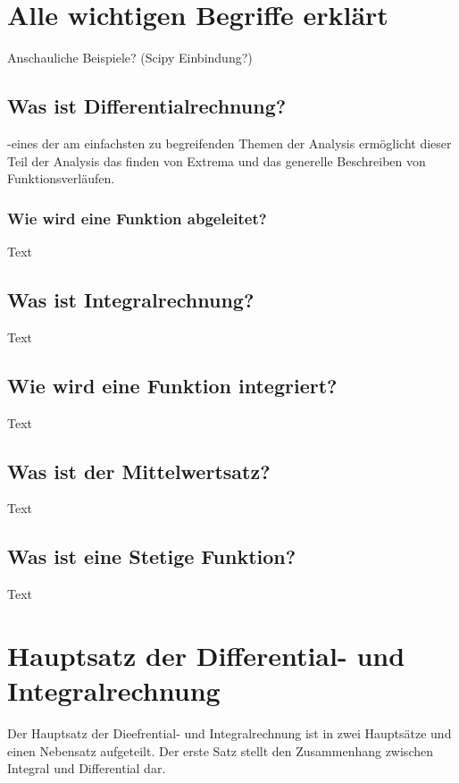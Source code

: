 \documentclass[fontsize=12pt,paper=a4,DIV12,cleardoublepage=empty, 
liststotoc,idxtotoc,bibtotoc]{article}
\theoremstyle{plain}
\theoremstyle{definition}
\begin{document}
	\section{Alle wichtigen Begriffe erklärt}
	Anschauliche Beispiele? (Scipy Einbindung?)
	
	
	\subsection{Was ist Differentialrechnung?}
	-eines der am einfachsten zu begreifenden Themen der Analysis ermöglicht dieser Teil der Analysis das finden von Extrema und das generelle Beschreiben von Funktionsverläufen.
	
	
	\subsubsection{Wie wird eine Funktion abgeleitet?}
		Text
	
	
	\subsection{Was ist Integralrechnung?}
		Text


	\subsection{Wie wird eine Funktion integriert?}
		Text
		
	
	\subsection{Was ist der Mittelwertsatz?}
		Text
		
	
	\subsection{Was ist eine Stetige Funktion?}
		Text	
	
	
	
	
	\section{Hauptsatz der Differential- und Integralrechnung}
	
	Der Hauptsatz der Dieefrential- und Integralrechnung ist in zwei Hauptsätze und einen Nebensatz aufgeteilt. Der erste Satz stellt den Zusammenhang zwischen Integral und Differential dar.
\end{document}
